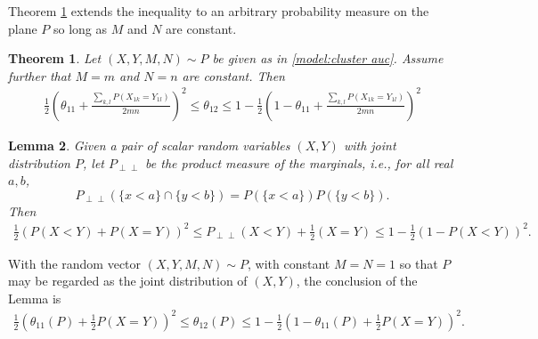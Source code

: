 \documentclass[12pt]{article}
\DeclareMathOperator{\AUC}{AUC}
\renewcommand{\P}{P}
\newcommand{\cind}{\perp \!\!\! \perp}
\newcommand{\aucindiv}{\theta_{11}}%
\newcommand{\aucpop}{\theta_{12}}%
\newtheorem{theorem}{Theorem}
\newtheorem{lemma}[theorem]{Lemma}
\begin{document}
Theorem \ref{theorem:bounds} extends the inequality to an arbitrary probability measure on the plane $\P$ so long as $M$ and $N$ are constant.

\begin{theorem}\label{theorem:bounds}
  Let $(X,Y,M,N)\sim \P$ be given as in \eqref{model:cluster auc}. Assume
  further that $M=m$ and $N=n$ are constant. Then
  \begin{align}
    \frac{1}{2}\left(\aucindiv+\frac{\sum_{k,l}\P(X_{1k}=Y_{1l})}{2mn}\right)^2 \le \aucpop \le 1-\frac{1}{2}\left(1-\aucindiv+\frac{\sum_{k,l}\P(X_{1k}=Y_{1l})}{2mn}\right)^2
  \end{align}
\end{theorem}
\begin{lemma}\label{lemma:bounds}  Given a pair of scalar random variables $(X,Y)$ with joint distribution $\P$, let $\P_{\cind}$ be the product measure of the marginals, i.e., for all real $a,b$,
  $$
  \P_{\cind}(\{x<a\}\cap\{y<b\})=\P(\{x<a\})\P(\{y<b\}).
  $$
  Then
  \begin{align}
    \frac{1}{2}(\P(X<Y)+\P(X=Y))^2 \le \P_{\cind}(X<Y)+\frac{1}{2}(X=Y)
    \le 1-\frac{1}{2}(1-\P(X<Y))^2.
  \end{align}
\end{lemma}

With the random vector $(X,Y,M,N) \sim \P$, with constant $M=N=1$ so that $\P$ may be regarded as the joint distribution of $(X,Y)$, the conclusion of the Lemma is
\begin{align}
  \frac{1}{2}(\aucindiv(\P)+\frac{1}{2}\P(X=Y))^2 \le \aucpop(P)
  \le 1-\frac{1}{2}(1-\aucindiv(\P)+\frac{1}{2}\P(X=Y))^2.\label{eqn:lemma:bounds:conclusion}
\end{align}
\end{document}
